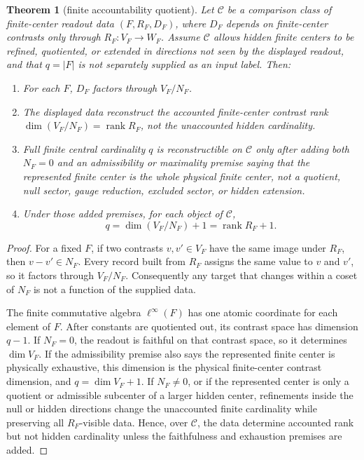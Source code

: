 \documentclass[12pt]{article}
\newtheorem{theorem}{Theorem}
\theoremstyle{definition}
\theoremstyle{remark}
\begin{document}
\begin{theorem}[finite accountability quotient]
\label{thm:accountability}
Let \(\mathcal C\) be a comparison class of finite-center readout data
\((F,R_F,D_F)\), where \(D_F\) depends on finite-center contrasts only through
\(R_F:V_F\to W_F\).  Assume \(\mathcal C\) allows hidden finite centers to be
refined, quotiented, or extended in directions not seen by the displayed
readout, and that \(q=|F|\) is not separately supplied as an input label.
Then:
\begin{enumerate}
  \item For each \(F\), \(D_F\) factors through \(V_F/N_F\).
  \item The displayed data reconstruct the accounted finite-center contrast
    rank \(\dim(V_F/N_F)=\operatorname{rank}R_F\), not the unaccounted hidden
    cardinality.
  \item Full finite central cardinality \(q\) is reconstructible on
    \(\mathcal C\) only after adding both \(N_F=0\) and an admissibility or
    maximality premise saying that the represented finite center is the whole
    physical finite center, not a quotient, null sector, gauge reduction,
    excluded sector, or hidden extension.
  \item Under those added premises, for each object of \(\mathcal C\),
    \[
      q=\dim(V_F/N_F)+1=\operatorname{rank}R_F+1 .
    \]
\end{enumerate}
\end{theorem}

\begin{proof}
For a fixed \(F\), if two contrasts \(v,v'\in V_F\) have the same image under
\(R_F\), then \(v-v'\in N_F\).  Every record built from \(R_F\) assigns the
same value to \(v\) and \(v'\), so it factors through \(V_F/N_F\).
Consequently any target that changes within a coset of \(N_F\) is not a
function of the supplied data.

The finite commutative algebra \(\ell^\infty(F)\) has one atomic coordinate
for each element of \(F\).  After constants are quotiented out, its contrast
space has dimension \(q-1\).  If \(N_F=0\), the readout is faithful on that
contrast space, so it determines \(\dim V_F\).  If the admissibility premise
also says the represented finite center is physically exhaustive, this
dimension is the physical finite-center contrast dimension, and
\(q=\dim V_F+1\).  If \(N_F\neq0\), or if the represented center is only a
quotient or admissible subcenter of a larger hidden center, refinements inside
the null or hidden directions change the unaccounted finite cardinality while
preserving all \(R_F\)-visible data.  Hence, over \(\mathcal C\), the data
determine accounted rank but not hidden cardinality unless the faithfulness and
exhaustion premises are added.
\end{proof}
\end{document}
